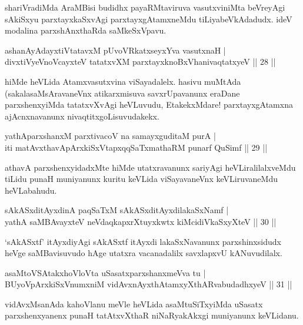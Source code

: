 \begin{artha}
shariVradiMda AraMBisi budidhx payaRMtaviruva vasutxviniMta beVreyAgi sAkiSxyu parxtayxkaSxvAgi parxtayxgAtamxneMdu tiLiyabeVkAdadudx. ideV modalina parxshAnxthaRda saMkeSxVpavu.
\end{artha}

\begin{shl}
ashanAyAdayxtiVtatavxM pUvoVRkatxseyxYva vasutxnaH |\\
divxtiVyeVnoVcayxteV tatatxvXM parxtayxknoBxVhanivaqtatxyeV \hfill || 28 ||
\end{shl}

\begin{artha}
hiMde heVLida Atamxvasutxvina viSayadalelx. hasivu muMtAda (sakalasaMsAravaneVnx atikarxmisuva savxrUpavanunx eraDane parxshenxyiMda tatatxvXvAgi heVLuvudu, EtakekxMdare! parxtayxgAtamxna ajAcnxnavanunx nivaqtitxgoLisuvudakekx.
\end{artha}

\begin{shl}
yathAparxshanxM parxtivacoV na samayxguditaM purA |\\
iti matAvx\s thavA\s pArxkiSxVtapxqqSaTxmathaRM punarf QuSimf \hfill || 29 ||
\end{shl}

\begin{artha}
athavA parxshenxyidadxMte hiMde utatxravanunx sariyAgi heVLiralilalxveMdu tiLidu punaH muniyanunx kuritu keVLida viSayavaneVnx keVLiruvaneMdu heVLabahudu.
\end{artha}

\begin{shl}
sAkASxditAyxdinA paqSaTxM sAkASxditAyxdilakaSxNamf |\\
yathA saMBAvayxteV neVdaqkapxrXtuyxkwtx kiMcidiVkaSxyXteV \hfill || 30 ||
\end{shl}

\begin{artha}%
`sAkASxtf' itAyxdiyAgi sAkASxtf itAyxdi lakaSxNavanunx parxshinxsidudx heVge saMBavisuvudo hAge utatxra vacanadalilx  savxlapxvU kANuvudilalx.
\end{artha}

\begin{shl}
asaMtoVSAtakxhoVloV\s ta uSasatxparxshanxmeVva tu |\\
BUyoV\s pArxkiSxVnumxniM vidAvxnAyxthAtamxyXthARvabudadhxyeV \hfill || 31 ||
\end{shl}

\begin{artha}
vidAvxMsanAda kahoVlanu meVle heVLida asaMtuSiTxyiMda uSasatx parxshenxyanenx punaH tatAtxvXthaR niNaRyakAkxgi muniyanunx keVLidanu.
\end{artha}

